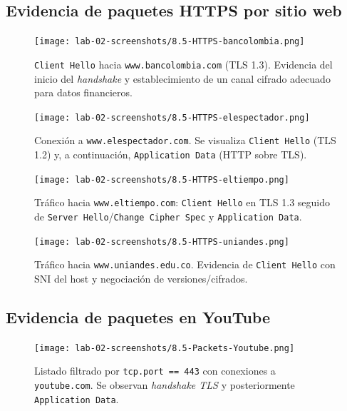 \documentclass[10pt]{article}
\begin{document}
\subsection*{Evidencia de paquetes HTTPS por sitio web}

\begin{figure}[H]
    \centering
    \texttt{[image: lab-02-screenshots/8.5-HTTPS-bancolombia.png]}
    \caption{\texttt{Client Hello} hacia \texttt{www.bancolombia.com} (TLS 1.3). Evidencia del inicio del \textit{handshake} y establecimiento de un canal cifrado adecuado para datos financieros.}
\end{figure}

\begin{figure}[H]
    \centering
    \texttt{[image: lab-02-screenshots/8.5-HTTPS-elespectador.png]}
    \caption{Conexión a \texttt{www.elespectador.com}. Se visualiza \texttt{Client Hello} (TLS 1.2) y, a continuación, \texttt{Application Data} (HTTP sobre TLS).}
\end{figure}

\begin{figure}[H]
    \centering
    \texttt{[image: lab-02-screenshots/8.5-HTTPS-eltiempo.png]}
    \caption{Tráfico hacia \texttt{www.eltiempo.com}: \texttt{Client Hello} en TLS 1.3 seguido de \texttt{Server Hello}/\texttt{Change Cipher Spec} y \texttt{Application Data}.}
\end{figure}

\begin{figure}[H]
    \centering
    \texttt{[image: lab-02-screenshots/8.5-HTTPS-uniandes.png]}
    \caption{Tráfico hacia \texttt{www.uniandes.edu.co}. Evidencia de \texttt{Client Hello} con SNI del host y negociación de versiones/cifrados.}
\end{figure}

\subsection*{Evidencia de paquetes en YouTube}

\begin{figure}[H]
    \centering
    \texttt{[image: lab-02-screenshots/8.5-Packets-Youtube.png]}
    \caption{Listado filtrado por \texttt{tcp.port == 443} con conexiones a \texttt{youtube.com}. Se observan \textit{handshake TLS} y posteriormente \texttt{Application Data}.}
\end{figure}
\end{document}
